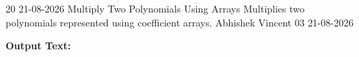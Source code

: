 \clearpage
\label{prog:20}
\programhead
  {20}
  {21-08-2026}
  {Multiply Two Polynomials Using Arrays}
  {Multiplies two polynomials represented using coefficient arrays.}
  {Abhishek Vincent}
  {03}
  {21-08-2026}

\divider
\textbf{Output Text:}\par
\vspace{2pt}

